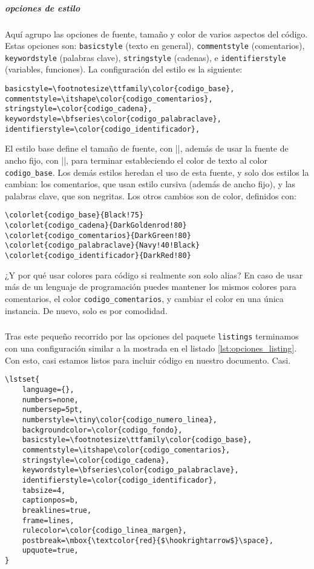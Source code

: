 \subparagraph{opciones de estilo} Aquí agrupo las opciones de fuente, tamaño y color de varios aspectos del código. Estas opciones son: \texttt{basicstyle} (texto en general), \texttt{commentstyle} (comentarios), \texttt{keywordstyle} (palabras clave), \texttt{stringstyle} (cadenas), e \texttt{identifierstyle} (variables, funciones). La configuración del estilo es la siguiente:

\begin{lstlisting}[style=latex]
basicstyle=\footnotesize\ttfamily\color{codigo_base},
commentstyle=\itshape\color{codigo_comentarios},
stringstyle=\color{codigo_cadena},
keywordstyle=\bfseries\color{codigo_palabraclave},
identifierstyle=\color{codigo_identificador},
\end{lstlisting}

El estilo base define el tamaño de fuente, con |\footnotesize|, además de usar la fuente de ancho fijo, con |\ttfamily|, para terminar estableciendo el color de texto al color \texttt{codigo\_base}. Los demás estilos heredan el uso de esta fuente, y solo dos estilos la cambian: los comentarios, que usan estilo cursiva (además de ancho fijo), y las palabras clave, que son negritas. Los otros cambios son de color, definidos con:

\begin{lstlisting}[style=latex]
\colorlet{codigo_base}{Black!75}
\colorlet{codigo_cadena}{DarkGoldenrod!80}
\colorlet{codigo_comentarios}{DarkGreen!80}
\colorlet{codigo_palabraclave}{Navy!40!Black}
\colorlet{codigo_identificador}{DarkRed!80}
\end{lstlisting}

¿Y por qué usar colores para código si realmente son solo alias? En caso de usar más de un lenguaje de programación puedes mantener los mismos colores para comentarios, el color \texttt{codigo\_comentarios}, y cambiar el color en una única instancia. De nuevo, solo es por comodidad.

\subparagraph{} Tras este pequeño recorrido por las opciones del paquete \texttt{listings} terminamos con una configuración similar a la mostrada en el listado \ref{lst:opciones_listing}. Con esto, casi estamos listos para incluir código en nuestro documento. Casi.

\begin{lstlisting}[style=latex,mathescape=false,label=lst:opciones_listing,caption={Opciones globales para listados.}]
\lstset{
    language={},
    numbers=none,
    numbersep=5pt,
    numberstyle=\tiny\color{codigo_numero_linea},
    backgroundcolor=\color{codigo_fondo},
    basicstyle=\footnotesize\ttfamily\color{codigo_base},
    commentstyle=\itshape\color{codigo_comentarios},
    stringstyle=\color{codigo_cadena},
    keywordstyle=\bfseries\color{codigo_palabraclave},
    identifierstyle=\color{codigo_identificador},
    tabsize=4,
    captionpos=b,
    breaklines=true,
    frame=lines,
    rulecolor=\color{codigo_linea_margen},
    postbreak=\mbox{\textcolor{red}{$\hookrightarrow$}\space},
    upquote=true,
}
\end{lstlisting}



